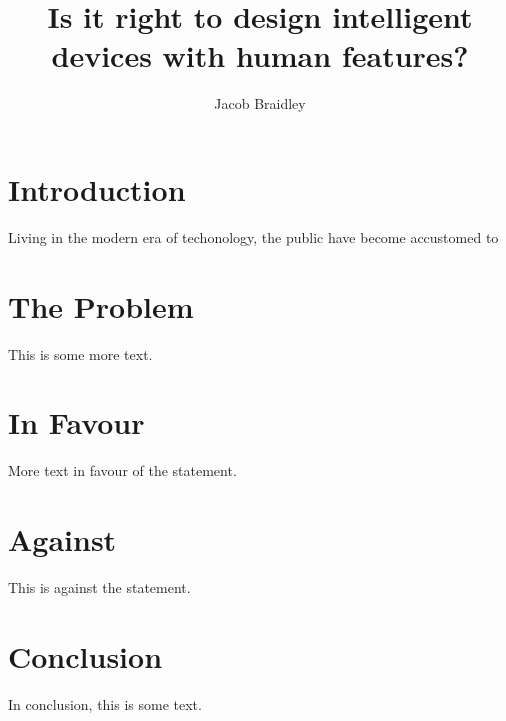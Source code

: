 \documentclass{article}
\title{Is it right to design intelligent devices with human features?}
\author{Jacob Braidley}
\begin{document}
\maketitle

\vspace{1cm}

\section{Introduction}
Living in the modern era of techonology, the public have become accustomed to 

\section{The Problem}
This is some more text.

\section{In Favour}
More text in favour of the statement.

\section{Against}
This is against the statement.

\section{Conclusion}
In conclusion, this is some text.

\vspace{.5cm}



\end{document}
